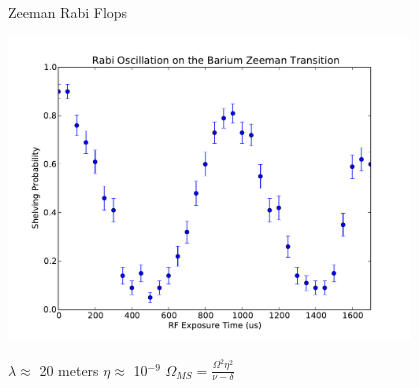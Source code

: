 \documentclass{beamer}
\begin{document}
\begin{frame}{Zeeman Rabi Flops}
	\centerline{\includegraphics[width=0.8\textwidth]{ZeemanRabi}}
	\centerline{\Large $\lambda \approx$ 20 meters \;\; $\eta \approx$ 10$^{-9}$ \;\; $\Omega_{MS} = \frac{\Omega^2 \eta^2}{ \nu - \delta }$}
\end{frame}
\end{document}
